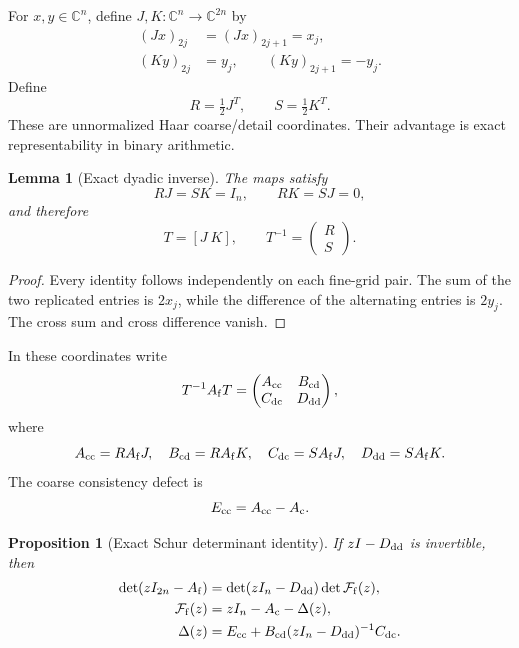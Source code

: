 \documentclass[11pt]{article}
\newtheorem{proposition}[theorem]{Proposition}
\newtheorem{lemma}[theorem]{Lemma}
\theoremstyle{definition}
\theoremstyle{remark}
\newcommand{\Id}{I}
\newcommand{\Ac}{A_{\mathrm c}}
\newcommand{\Af}{A_{\mathrm f}}
\begin{document}
For \(x,y\in\mathbb C^n\), define \(J,K:\mathbb C^n\to\mathbb C^{2n}\) by
\begin{align}
 (Jx)_{2j}&=(Jx)_{2j+1}=x_j,\label{eq:J}\\
 (Ky)_{2j}&=y_j,\qquad (Ky)_{2j+1}=-y_j.\label{eq:K}
\end{align}
Define
\begin{equation}
 R=\tfrac12J^T,\qquad S=\tfrac12K^T.
 \label{eq:RS}
\end{equation}
These are unnormalized Haar coarse/detail coordinates.  Their advantage is
exact representability in binary arithmetic.

\begin{lemma}[Exact dyadic inverse]
\label{lem:dyadic-inverse}
The maps satisfy
\[
 RJ=SK=\Id_n,\qquad RK=SJ=0,
\]
and therefore
\begin{equation}
 T=[J\ K],\qquad T^{-1}=\begin{pmatrix}R\\S\end{pmatrix}.
 \label{eq:T}
\end{equation}
\end{lemma}

\begin{proof}
Every identity follows independently on each fine-grid pair.  The sum of the
two replicated entries is \(2x_j\), while the difference of the alternating
entries is \(2y_j\).  The cross sum and cross difference vanish.
\end{proof}

In these coordinates write
\begin{equation}
 T^{-1}\Af T=
 \begin{pmatrix}
  A_{\rm cc}&B_{\rm cd}\\
  C_{\rm dc}&D_{\rm dd}
 \end{pmatrix},
 \label{eq:block-matrix}
\end{equation}
where
\begin{equation}
 A_{\rm cc}=R\Af J,\quad
 B_{\rm cd}=R\Af K,\quad
 C_{\rm dc}=S\Af J,\quad
 D_{\rm dd}=S\Af K.
 \label{eq:blocks}
\end{equation}
The coarse consistency defect is
\begin{equation}
 E_{\rm cc}=A_{\rm cc}-\Ac.
 \label{eq:Ecc}
\end{equation}

\begin{proposition}[Exact Schur determinant identity]
\label{prop:schur}
If \(z\Id-D_{\rm dd}\) is invertible, then
\begin{align}
 \det(z\Id_{2n}-\Af)
 &=\det(z\Id_n-D_{\rm dd})\det \mathcal F_{\rm f}(z),
 \label{eq:schur-det}\\
 \mathcal F_{\rm f}(z)
 &=z\Id_n-\Ac-\Delta(z),\label{eq:effective}\\
 \Delta(z)
 &=E_{\rm cc}+B_{\rm cd}(z\Id_n-D_{\rm dd})^{-1}C_{\rm dc}.
 \label{eq:self-energy}
\end{align}
\end{proposition}
\end{document}
